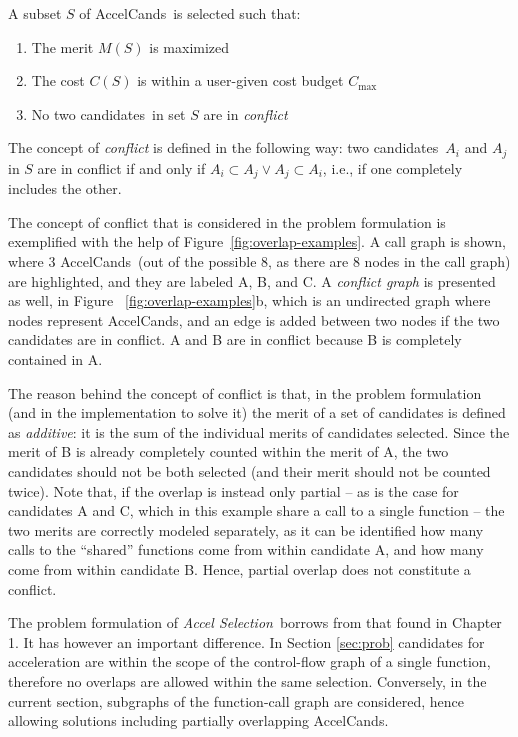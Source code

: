 \documentclass[]{usiinfthesis}
\newcommand{\candidates}{{AccelCand}s}
\newcommand{\candidatesW}{candidates}
\newcommand{\asprobname}{\emph{Accel Selection}}
\begin{document}
A subset $S$ of \candidates\ is selected such that:
\begin{enumerate}
\item The merit $M(S)$ is maximized
\item The cost $C(S)$ is within a user-given cost budget $C_{\max}$
\item No two \candidatesW\ in set $S$ are in \emph{conflict}
\end{enumerate}

The concept of \emph{conflict} is defined in the following way: two
\candidatesW\ $A_i$ and $A_j$ in $S$ are in conflict if and only if
$A_i\subset A_j \lor A_j\subset A_i$, i.e., if one completely includes the other.\par

The concept of conflict that is considered in the problem formulation is
exemplified with the help of Figure~\ref{fig:overlap-examples}. A call
graph is shown, where 3 \candidates\ (out of the possible 8, as there
are 8 nodes in the call graph) are highlighted, and they are labeled
A, B, and C. A \emph{conflict graph} is presented as well, in Figure
~\ref{fig:overlap-examples}b, which is an undirected graph where nodes
represent \candidates, and an edge is added between two nodes if the
two candidates are in conflict. A and B are in conflict because B is
completely contained in A.\par

The reason behind the concept of conflict is that, in the problem
formulation (and in the implementation to solve it) the merit of a set
of candidates is defined as \emph{additive}: it is the sum of the
individual merits of candidates selected. Since the merit of B is
already completely counted within the merit of A, the two candidates
should not be both selected (and their merit should not be counted
twice).
Note that, if the overlap is instead only partial -- as is the case for 
candidates A and C, which in this example share a call to a single function 
-- the two merits are correctly modeled separately, as it can be 
identified how many calls to the ``shared'' functions come from within candidate A, 
and how many come from within candidate B. Hence, partial overlap does not constitute 
a conflict.\par

The problem formulation of \asprobname\
borrows from that found in Chapter 1. It has however
an important difference. In Section \ref{sec:prob} candidates for acceleration %
are within the scope of the control-flow graph of a single function, therefore 
no overlaps are allowed within the same selection. Conversely, in the current section, 
subgraphs of the function-call graph are considered, hence allowing solutions including 
partially overlapping \candidates.
\end{document}
